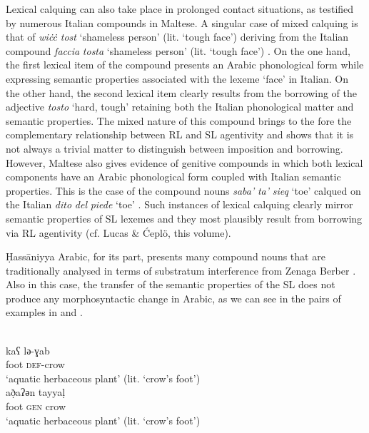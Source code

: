 \documentclass[output=paper]{langsci/langscibook}
\begin{document}
Lexical calquing can also take place in prolonged contact situations, as testified by numerous Italian compounds in Maltese. A singular case of mixed calquing is that of \textit{wi\.c\.c} \textit{tost} ‘shameless person’ (lit. ‘tough face’) deriving from the Italian compound \textit{faccia} \textit{tosta} ‘shameless person’ (lit. ‘tough face’) \citep{Aquilina1987}. On the one hand, the first lexical item of the compound presents an Arabic phono\-logical form while expressing semantic properties associated with the lexeme ‘face’ in Italian. On the other hand, the second lexical item clearly results from the borrowing of the adjective \textit{tosto} ‘hard, tough’ retaining both the Italian phono\-logical matter and semantic properties. The mixed nature of this compound brings to the fore the complementary relationship between RL and SL agentivity and shows that it is not always a trivial matter to distinguish between imposition and borrowing. However, Maltese also gives evidence of genitive compounds in which both lexical components have an Arabic phonological form coupled with Italian semantic properties. This is the case of the compound nouns \textit{saba'} \textit{ta'} \textit{sieq} ‘toe’ calqued on the Italian \textit{dito} \textit{del} \textit{piede} ‘toe’ \citep{Pepperforthcoming}. Such instances of lexical calquing clearly mirror semantic properties of SL lexemes and they most plausibly result from borrowing via RL agentivity (cf. Lucas \& Ćeplö, this volume). 

Ḥassāniyya Arabic, for its part, presents many compound nouns that are traditionally analysed in terms of substratum interference from Zenaga Berber \citep{Taine-Cheikh2008chapter,Taine-Cheikh2012}. Also in this case, the transfer of the semantic properties of the SL does not produce any morphosyntactic change in Arabic, as we can see in the pairs of examples in  and .

\ea\label{ex:crow}
\\
\gll   k{\R}aʕ lә-ɣ{\R}ab  \\
       foot \textsc{def}-crow\\
\glt   `aquatic herbaceous plant' (lit.  ‘crow’s foot’)
\newpage
{}\\
\gll   að̣aʔ\R әn tayyaḷ \\
       foot \textsc{gen} crow \\
\glt   `aquatic herbaceous plant' (lit. ‘crow’s foot’)
\z
\z
\end{document}
